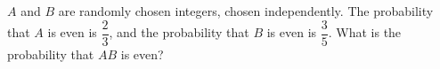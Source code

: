 $A$ and $B$ are randomly chosen integers, chosen independently. The probability that $A$ is even is $\dfrac{2}{3}$, and the probability that $B$ is even is $\dfrac{3}{5}$. What is the probability that $AB$ is even?
